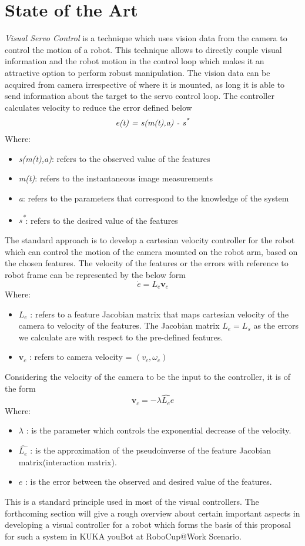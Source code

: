 \section{State of the Art}
\textit{Visual Servo Control} is a technique which uses vision data from the camera to control the motion of a robot. This technique allows to directly couple visual information and the robot motion in the control loop which makes it an attractive option to perform robust manipulation. The vision data can be acquired from camera irrespective of where it is mounted, as long it is able to send information about the target to the servo control loop. The controller calculates velocity to reduce the error defined below \cite{Hutchinson2006}
\[\textit{e(t) = s(m(t),a) - s\textsuperscript{*}}\]
Where:
\begin{itemize}[label=]
    \item \textit{s(m(t),a)}: refers to the observed value of the features
    \item \textit{m(t)}:      refers to the instantaneous image measurements
    \item \textit{a}:         refers to the parameters that correspond to the knowledge of the system
    \item  \textit{s\textsuperscript{*}}:       refers to the desired value of the features
\end{itemize}
The standard approach is to develop a cartesian velocity controller for the robot which can control the motion of the camera mounted on the robot arm, based on the chosen features\cite{Hutchinson2006}. The velocity of the features or the errors with reference to robot frame can be represented by the below form
\[\dot{e} = L_{e}\mathbf{v}_{c}\] 
Where:
\begin{itemize}[label=]
    \item \textit{ $L_{e}$ }: refers to a feature Jacobian matrix that maps cartesian velocity of the camera to velocity of the features. The Jacobian matrix $L_{e} = L_{s}$ as the errors we calculate are with respect to the pre-defined features.
    \item \textit{ $\mathbf{v}_{c}$ }: refers to camera velocity = $({v}_{c},{\omega}_{c})$ 
\end{itemize}
 Considering the velocity of the camera to be the input to the controller, it is of the form
\[\mathbf{v}_{c}= -\lambda\widehat{L_{e}}e\]
Where:
\begin{itemize}[label=]
    \item \textit{ $\lambda$ }: is the parameter which controls the exponential decrease of the velocity.
    \item \textit{ $\widehat{L_{e}}$ }: is the approximation of the pseudoinverse of the feature Jacobian matrix(interaction matrix).
    \item \textit{ $e$ }: is the error between the observed and desired value of the features.
\end{itemize}
This is a standard principle used in most of the visual controllers\cite{Hutchinson2006}. The forthcoming section will give a rough overview about certain important aspects in developing a visual controller for a robot which forms the basis of this proposal for such a system in KUKA youBot at RoboCup@Work Scenario.

